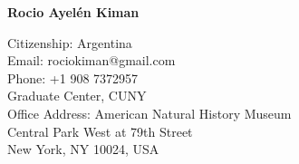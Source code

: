 \documentclass[10pt]{cv}
\newcommand{\firstpagestyle}{empty} %
\begin{document}
\thispagestyle{\firstpagestyle} 
\begin{center}
{\huge \textbf{\sc Rocio Ayel\'en Kiman}}\\
\bigskip
\bigskip
\end{center}
\normalsize
  
\addresses
{
Citizenship: Argentina\\
Email: rociokiman@gmail.com\\
Phone: +1 908 7372957 \\
}
{
Graduate Center, CUNY\\
Office Address: American Natural History Museum\\
Central Park West at 79th Street\\
New York, NY 10024, USA\\ 
\\
}
\end{document}
